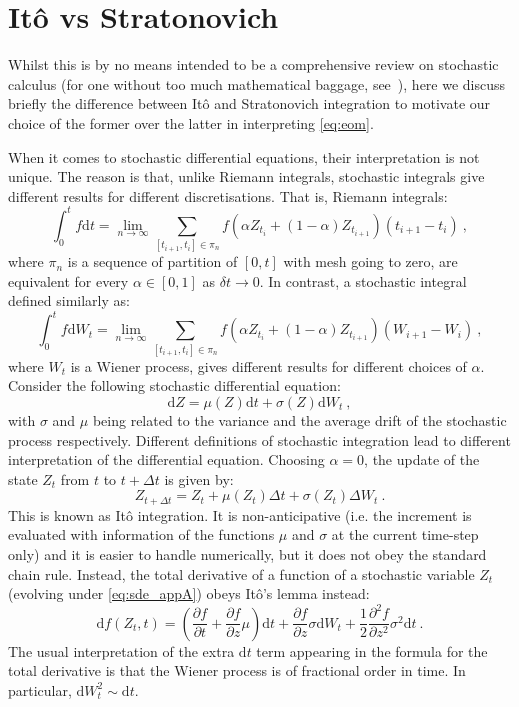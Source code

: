 \documentclass[amsmath,amssymb,11pt]{article}
\begin{document}
\section{It\^o vs Stratonovich} \label{app:ito}
Whilst this is by no means intended to be a comprehensive review on stochastic calculus (for one without too much mathematical baggage, see~\cite{risken1985fokker}), here we discuss briefly the difference between It\^{o} and Stratonovich integration to motivate our choice of the former over the latter in interpreting \eqref{eq:eom}.

When it comes to stochastic differential equations, their interpretation is not  unique. The reason is that, unlike Riemann integrals, stochastic integrals give different results for different discretisations. That is, Riemann integrals:
\begin{equation}
    \int_0^t f \text{d}t = \lim_{n\to \infty} \sum_{[t_{i+1},t_i] \in \pi_n } f(\alpha Z_{t_i} + (1-\alpha) Z_{t_{i+1}}) (t_{i+1}-t_i) \ ,
\end{equation}
where $\pi_n$ is a sequence of partition of $[0,t]$ with mesh going to zero, are equivalent for every $\alpha \in [0,1]$ as $\delta t \to 0$. In contrast, a stochastic integral defined similarly as:
\begin{equation}
    \int_0^t f \text{d}W_t = \lim_{n\to \infty} \sum_{[t_{i+1},t_i] \in \pi_n } f(\alpha Z_{t_i} + (1-\alpha) Z_{t_{i+1}}) (W_{i+1}-W_i) \ ,
\end{equation}
where $W_t$ is a Wiener process, gives different results for different choices of $\alpha$. Consider the following stochastic differential equation:
\begin{equation}
\label{eq:sde_appA}
    \text{d}Z = \mu(Z) \text{d}t + \sigma(Z) \text{d}W_t \ ,
\end{equation}
with $\sigma$ and $\mu$ being related to the variance and the average drift of the stochastic process respectively. Different definitions of stochastic integration lead to different interpretation of the differential equation.
Choosing $\alpha=0$, the update of the state $Z_t$ from $t$ to $t+\Delta t$ is given by:
\begin{equation}
    Z_{t+\Delta t} =Z_t + \mu(Z_t) \Delta t +\sigma(Z_t) \Delta W_t \ .
\end{equation}
This is known as It\^o integration. It is non-anticipative (i.e. the increment is evaluated with information of the functions $\mu$ and $\sigma$ at the current time-step only) and it is easier to handle numerically, but it does not obey the standard chain rule. Instead, the total derivative of a function of a stochastic variable $Z_t$ (evolving under \eqref{eq:sde_appA}) obeys It\^{o}'s lemma instead:
\begin{equation}
    \text{d}f(Z_t,t) = \left(\frac{\partial f}{\partial t} + \frac{\partial f}{\partial z} \mu \right) \text{d}t + \frac{\partial f}{\partial z} \sigma \text{d}W_t + \frac{1}{2} \frac{\partial^2 f}{\partial z^2} \sigma^2 \text{d}t \ .
\end{equation}
The usual interpretation of the extra $\text{d}t$ term appearing in the formula for the total derivative is that the Wiener process is of fractional order in time. In particular, $\text{d}W_t^2 \sim \text{d}t$.
\end{document}

